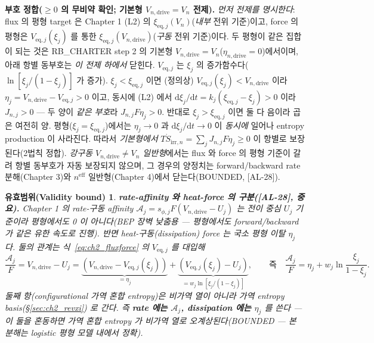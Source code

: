 \documentclass[11pt,a4paper]{article}
\newtheorem*{boundbox}{유효범위(Validity bound)}
\newcommand{\dd}{\mathrm{d}}
\newcommand{\eff}{\mathrm{eff}}
\newcommand{\eq}{\mathrm{eq}}
\newcommand{\drive}{\mathrm{drive}}
\newcommand{\irr}{\mathrm{irr}}
\newcommand{\AL}[1]{\textsf{[AL-#1]}}
\begin{document}
\textbf{부호 정합($\ge0$ 의 무비약 확인; 기본형 $V_{n,\drive}=V_n$ 전제).} \emph{먼저 전제를 명시한다}: flux 의
평형 target 은 Chapter 1 (L2) 의 $\xi_{\eq,j}(V_n)$(\emph{내부} 전위 기준)이고, force 의 평형은 $V_{\eq,j}(\xi_j)$
를 통한 $\xi_{\eq,j}(V_{n,\drive})$(\emph{구동} 전위 기준)이다. 두 평형이 같은 집합이 되는 것은 RB\_CHARTER step 2
의 기본형 $V_{n,\drive}=V_n$($\eta_{n,\drive}=0$)에서이며, 아래 항별 동부호는 \emph{이 전제 하에서} 닫힌다.
$V_{\eq,j}$ 는 $\xi_j$ 의 증가함수다($\ln[\xi_j/(1-\xi_j)]$ 가 증가).
$\xi_j<\xi_{\eq,j}$ 이면 (정의상) $V_{\eq,j}(\xi_j)<V_{n,\drive}$ 이라 $\eta_j=V_{n,\drive}-V_{\eq,j}>0$
이고, 동시에 (L2) 에서 $\dd\xi_j/\dd t=k_j(\xi_{\eq,j}-\xi_j)>0$ 이라 $J_{n,j}>0$ — 두 양이 \emph{같은 부호}라
$J_{n,j}F\eta_j>0$. 반대로 $\xi_j>\xi_{\eq,j}$ 이면 둘 다 음이라 곱은 여전히 양. 평형($\xi_j=\xi_{\eq,j}$)에서는
$\eta_j\to0$ 과 $\dd\xi_j/\dd t\to0$ 이 \emph{동시에} 일어나 entropy production 이 사라진다. 따라서
\emph{기본형에서} $T\dot S_{\irr,n}=\sum_j J_{n,j}F\eta_j\ge0$ 이 항별로 보장된다(2법칙 정합). \emph{강구동
$V_{n,\drive}\ne V_n$ 일반형}에서는 flux 와 force 의 평형 기준이 갈려 항별 동부호가 자동 보장되지 않으며, 그 경우의
양정치는 forward/backward rate 분해(Chapter 3)와 $n^\eff$ 일반형(Chapter 4)에서 닫는다(BOUNDED, \AL{28}).
\begin{boundbox}
\textbf{rate-affinity 와 heat-force 의 구분(\AL{28}, 중요).} Chapter 1 의 \emph{rate-구동} affinity
$\mathcal A_j=s_{\phi,j}F(V_{n,\drive}-U_j)$ 는 전이 \emph{중심} $U_j$ 기준이라 평형에서도 0 이 아니다(BEP
장벽 낮춤용 — 평형에서도 forward/backward 가 같은 유한 속도로 진행). 반면 \emph{heat-구동}(dissipation)
force 는 국소 평형 이탈 $\eta_j$ 다. 둘의 관계는 식~\eqref{eq:ch2_fluxforce} 의 $V_{\eq,j}$ 를 대입해
\begin{equation*}
\frac{\mathcal A_j}{F}=V_{n,\drive}-U_j=\underbrace{(V_{n,\drive}-V_{\eq,j}(\xi_j))}_{=\eta_j}+\underbrace{(V_{\eq,j}(\xi_j)-U_j)}_{=w_j\ln[\xi_j/(1-\xi_j)]},
\qquad\text{즉}\quad\frac{\mathcal A_j}{F}=\eta_j+w_j\ln\frac{\xi_j}{1-\xi_j}.
\end{equation*}
둘째 항(configurational 가역 혼합 entropy)은 \emph{비가역 열이 아니라} 가역 entropy basis(\S\ref{sec:ch2_revxi})
로 간다. 즉 \textbf{rate 에는 $\mathcal A_j$, dissipation 에는 $\eta_j$} 를 쓴다 — 이 둘을 혼동하면 가역 혼합
entropy 가 비가역 열로 오계상된다(BOUNDED — 본 분해는 logistic 평형 모델 내에서 정확).
\end{boundbox}
\end{document}
